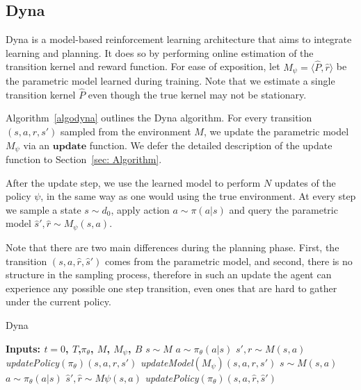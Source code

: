 \documentclass{article}
\begin{document}
\subsection{ Dyna}
    Dyna \cite{sutton2012dyna} is a model-based reinforcement learning architecture that aims to integrate learning and planning. 
    It does so by performing online estimation of the transition kernel and reward function. For ease of exposition, let $M_\psi = \langle \hat{P}, \hat{r} \rangle$ be the parametric model learned during training. Note that we estimate a single transition kernel $\hat{P}$ even though the true kernel may not be stationary.%
    
	Algorithm~\ref{algodyna} outlines the Dyna algorithm. 
    For every transition $(s,a,r,s')$ sampled from the environment $M$, we update the parametric model $M_\psi$ via an $\textbf{update}$ function. We defer the detailed description of the update function to Section~\ref{sec: Algorithm}.
    
    After the update step, we use the learned model to perform $N$ updates of the policy $\psi$, in the same way as one would using the true environment. At every step we sample a state $s \sim d_0$, apply action $a \sim \pi( a\rvert s) $ and query the parametric model $\hat{s}', \hat{r} \sim M_\psi(s,a)$. %
    
    Note that there are two main differences during the planning phase. First, the transition $(s, a, \hat{r}, \hat{s}')$ comes from the parametric model, and second, there is no structure in the sampling process, therefore in such an update the agent can experience any possible one step transition, even ones that are hard to gather under the current policy.
    \begin{algorithm}[t]
    	\caption{Dyna}
    	\begin{algorithmic}[1]
    		\STATE \textbf{Inputs: $t=0$, $T$,$\pi_\theta$, $M$, $M_\psi$, $B$}
    			\STATE $s \sim M$
    			\STATE $a \sim \pi_\theta(a \rvert s)$
    			\STATE $s',r \sim M(s,a)$
				\STATE \textit{updatePolicy}$(\pi_\theta)(s,a,r, s')$
    			\STATE \textit{updateModel}$(M_\psi)(s,a,r, s')$
        				\STATE  $s \sim M(s,a)$
        				\STATE  $a \sim \pi_\theta(a \rvert s)$
        				\STATE $\hat{s}', \hat{r} \sim M\psi(s,a)$
        				\STATE \textit{updatePolicy}$(\pi_\theta)(s,a,\hat{r}, \hat{s}')$
        			\ENDFOR
        		\ENDIF
    		\ENDWHILE
    	\end{algorithmic}
    	\label{algodyna}
    \end{algorithm}
    
\end{document}
